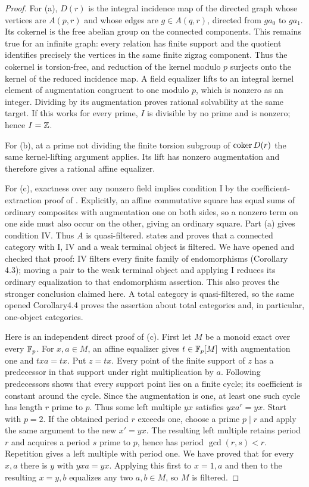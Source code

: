 \begin{proof}
For (a), $D(r)$ is the integral incidence map of the directed graph whose vertices are $A(p,r)$ and whose edges are $g\in A(q,r)$, directed from $ga_0$ to $ga_1$. Its cokernel is the free abelian group on the connected components. This remains true for an infinite graph: every relation has finite support and the quotient identifies precisely the vertices in the same finite zigzag component. Thus the cokernel is torsion-free, and reduction of the kernel modulo $p$ surjects onto the kernel of the reduced incidence map. A field equalizer lifts to an integral kernel element of augmentation congruent to one modulo $p$, which is nonzero as an integer. Dividing by its augmentation proves rational solvability at the same target. If this works for every prime, $I$ is divisible by no prime and is nonzero; hence $I=\mathbb Z$.

For (b), at a prime not dividing the finite torsion subgroup of $\operatorname{coker} D(r)$ the same kernel-lifting argument applies. Its lift has nonzero augmentation and therefore gives a rational affine equalizer.

For (c), exactness over any nonzero field implies condition I by the coefficient-extraction proof of \citet[Lemma 3.2 and the coefficient-ring remark after Proposition 3.3]{IsbellMitchell1976}. Explicitly, an affine commutative square has equal sums of ordinary composites with augmentation one on both sides, so a nonzero term on one side must also occur on the other, giving an ordinary square. Part (a) gives condition IV. Thus $A$ is quasi-filtered. \citet[Corollary 4.4]{IsbellMitchell1976} states and proves that a connected category with I, IV and a weak terminal object is filtered. We have opened and checked that proof: IV filters every finite family of endomorphisms (Corollary 4.3); moving a pair to the weak terminal object and applying I reduces its ordinary equalization to that endomorphism assertion. This also proves the stronger conclusion claimed here. A total category is quasi-filtered, so the same opened Corollary4.4 proves the assertion about total categories and, in particular, one-object categories.

Here is an independent direct proof of (c). First let $M$ be a monoid
exact over every $\mathbb F_p$. For $x,a\in M$, an affine equalizer gives
$t\in\mathbb F_p[M]$ with augmentation one and $txa=tx$. Put $z=tx$.
Every point of the finite support of $z$ has a predecessor in that
support under right multiplication by $a$. Following predecessors
shows that every support point lies on a finite cycle; its coefficient
is constant around the cycle. Since the augmentation is one, at least
one such cycle has length $r$ prime to $p$. Thus some left multiple
$yx$ satisfies $yx a^r=yx$. Start with $p=2$. If the obtained period
$r$ exceeds one, choose a prime $p\mid r$ and apply the same argument
to the new $x'=yx$. The resulting left multiple retains period $r$
and acquires a period $s$ prime to $p$, hence has period
$\gcd(r,s)<r$. Repetition gives a left multiple with period one.
We have proved that for every $x,a$ there is $y$ with $yxa=yx$.
Applying this first to $x=1,a$ and then to the resulting $x=y,b$
equalizes any two $a,b\in M$, so $M$ is filtered.


\end{proof}

